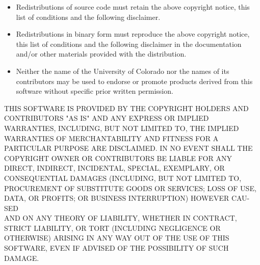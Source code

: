 \documentclass[a4paper,10pt]{article}
\begin{document}
\begin{itemize}
\item
Redistributions of source code must retain the above copyright
notice, this list of conditions and the following disclaimer.
\item
Redistributions in binary form must reproduce the above copyright
notice, this list of conditions and the following disclaimer in the
documentation and/or other materials provided with the distribution.
\item
Neither the name of the University of Colorado nor the names of its
contributors may be used to endorse or promote products derived from
this software without specific prior written permission.
\end{itemize}
THIS SOFTWARE IS PROVIDED BY THE COPYRIGHT HOLDERS AND CONTRIBUTORS
"AS IS" AND ANY EXPRESS OR IMPLIED WARRAN\-TIES, INCLUDING, BUT NOT
LIMITED TO, THE IMPLIED WARRANTIES OF MERCHANTABILITY AND FITNESS
FOR A PARTICULAR PURPOSE ARE DISCLAIMED. IN NO EVENT SHALL THE
COPYRIGHT OWNER OR CONTRIBUTORS BE LIABLE FOR ANY DIRECT, INDIRECT,
INCIDENTAL, SPECIAL, EXEMPLARY, OR CONSEQUENTIAL DAMAGES (INCLUDING,
BUT NOT LIMITED TO, PROCUREMENT OF SUBSTITUTE GOODS OR SERVICES;
LOSS OF USE, DATA, OR PROFITS; OR BUSINESS INTERRUPTION) HOWEVER
CAU-SED
\\ AND ON ANY THEORY OF LIABILITY, WHETHER IN CONTRACT, STRICT
LIABILITY, OR TORT (INCLUDING NEGLIGENCE OR OTHERWISE) ARISING IN
ANY WAY OUT OF THE USE OF THIS SOFTWARE, EVEN IF ADVISED OF THE
POSSIBILITY OF SUCH DAMAGE.




\end{document}
